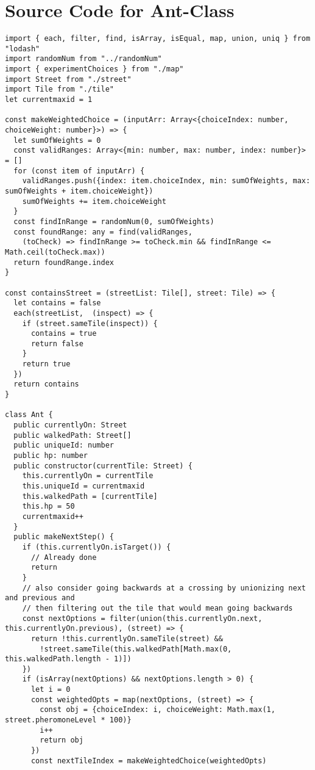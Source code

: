 \section{Source Code for Ant-Class}
\label{src:logicant}
\begin{lstlisting}
import { each, filter, find, isArray, isEqual, map, union, uniq } from "lodash"
import randomNum from "../randomNum"
import { experimentChoices } from "./map"
import Street from "./street"
import Tile from "./tile"
let currentmaxid = 1

const makeWeightedChoice = (inputArr: Array<{choiceIndex: number, choiceWeight: number}>) => {
  let sumOfWeights = 0
  const validRanges: Array<{min: number, max: number, index: number}> = []
  for (const item of inputArr) {
    validRanges.push({index: item.choiceIndex, min: sumOfWeights, max: sumOfWeights + item.choiceWeight})
    sumOfWeights += item.choiceWeight
  }
  const findInRange = randomNum(0, sumOfWeights)
  const foundRange: any = find(validRanges,
    (toCheck) => findInRange >= toCheck.min && findInRange <= Math.ceil(toCheck.max))
  return foundRange.index
}

const containsStreet = (streetList: Tile[], street: Tile) => {
  let contains = false
  each(streetList,  (inspect) => {
    if (street.sameTile(inspect)) {
      contains = true
      return false
    }
    return true
  })
  return contains
}

class Ant {
  public currentlyOn: Street
  public walkedPath: Street[]
  public uniqueId: number
  public hp: number
  public constructor(currentTile: Street) {
    this.currentlyOn = currentTile
    this.uniqueId = currentmaxid
    this.walkedPath = [currentTile]
    this.hp = 50
    currentmaxid++
  }
  public makeNextStep() {
    if (this.currentlyOn.isTarget()) {
      // Already done
      return
    }
    // also consider going backwards at a crossing by unionizing next and previous and
    // then filtering out the tile that would mean going backwards
    const nextOptions = filter(union(this.currentlyOn.next, this.currentlyOn.previous), (street) => {
      return !this.currentlyOn.sameTile(street) &&
        !street.sameTile(this.walkedPath[Math.max(0, this.walkedPath.length - 1)])
    })
    if (isArray(nextOptions) && nextOptions.length > 0) {
      let i = 0
      const weightedOpts = map(nextOptions, (street) => {
        const obj = {choiceIndex: i, choiceWeight: Math.max(1, street.pheromoneLevel * 100)}
        i++
        return obj
      })
      const nextTileIndex = makeWeightedChoice(weightedOpts)


\end{lstlisting}
